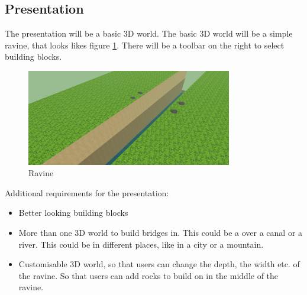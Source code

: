 \subsection{Presentation}
The presentation will be a basic 3D world. The basic 3D world will be a simple ravine, that looks likes figure \ref{fig:rav}. There will be a toolbar on the right to select building blocks.
\begin{figure}[H]
    \centering
    \includegraphics[width=0.8\textwidth]{pics/Ravine.png}
    \caption{Ravine}
    \label{fig:rav}
\end{figure}
 Additional requirements for the presentation:
 \begin{itemize}
 \item Better looking building blocks
 \item More than one 3D world to build bridges in. This could be a over a canal or a river. This could be in different places, like in a city or a mountain.
 \item Customisable 3D world, so that users can change the depth, the width etc. of the ravine. So that users can add rocks to build on in the middle of the ravine.
 \end{itemize}